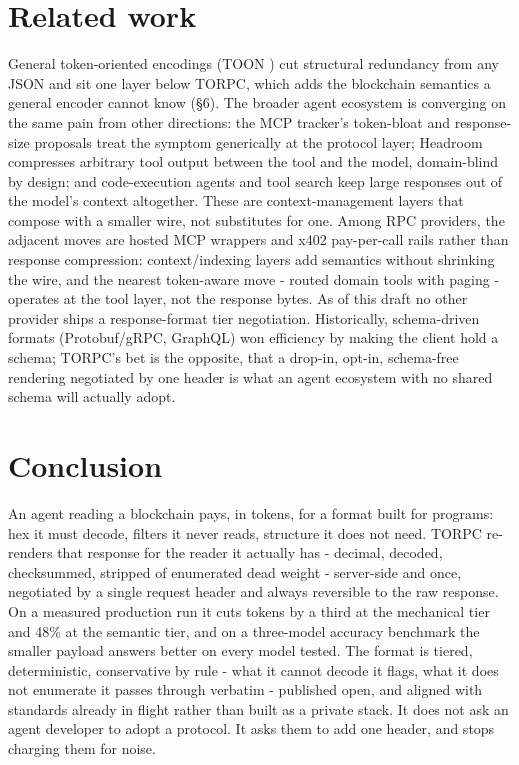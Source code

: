 \documentclass[11pt]{article}
\begin{document}
\section{Related work}

General token-oriented encodings (TOON \cite{toon}) cut structural redundancy from any JSON and sit one layer below TORPC, which adds the blockchain semantics a general encoder cannot know (\S6). The broader agent ecosystem is converging on the same pain from other directions: the MCP tracker's token-bloat and response-size proposals \cite{mcpbloat, mcpsize} treat the symptom generically at the protocol layer; Headroom \cite{headroom} compresses arbitrary tool output between the tool and the model, domain-blind by design; and code-execution agents and tool search \cite{codemode, toolsearch} keep large responses out of the model's context altogether. These are context-management layers that compose with a smaller wire, not substitutes for one. Among RPC providers, the adjacent moves are hosted MCP wrappers and x402 pay-per-call rails rather than response compression: context/indexing layers add semantics without shrinking the wire, and the nearest token-aware move - routed domain tools with paging - operates at the tool layer, not the response bytes. As of this draft no other provider ships a response-format tier negotiation. Historically, schema-driven formats (Protobuf/gRPC, GraphQL) won efficiency by making the client hold a schema; TORPC's bet is the opposite, that a drop-in, opt-in, schema-free rendering negotiated by one header is what an agent ecosystem with no shared schema will actually adopt.

\section{Conclusion}

An agent reading a blockchain pays, in tokens, for a format built for programs: hex it must decode, filters it never reads, structure it does not need. TORPC re-renders that response for the reader it actually has - decimal, decoded, checksummed, stripped of enumerated dead weight - server-side and once, negotiated by a single request header and always reversible to the raw response. On a measured production run it cuts tokens by a third at the mechanical tier and 48\% at the semantic tier, and on a three-model accuracy benchmark the smaller payload answers better on every model tested. The format is tiered, deterministic, conservative by rule - what it cannot decode it flags, what it does not enumerate it passes through verbatim - published open, and aligned with standards already in flight rather than built as a private stack. It does not ask an agent developer to adopt a protocol. It asks them to add one header, and stops charging them for noise.
\end{document}
